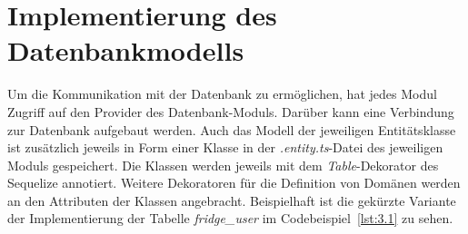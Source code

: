 \FloatBarrier
\section{Implementierung des Datenbankmodells}\label{sec:Implementierung des Datenbankmodells}

Um die Kommunikation mit der Datenbank zu ermöglichen, hat jedes Modul Zugriff auf den Provider des Datenbank-Moduls. Darüber kann eine Verbindung zur Datenbank aufgebaut werden. Auch das Modell der jeweiligen Entitätsklasse ist zusätzlich jeweils in Form einer Klasse in der \textit{.entity.ts}-Datei des jeweiligen Moduls gespeichert. Die Klassen werden jeweils mit dem \textit{Table}-Dekorator des  Sequelize annotiert. Weitere Dekoratoren für die Definition von Domänen werden an den Attributen der Klassen angebracht. Beispielhaft ist die gekürzte Variante der Implementierung der Tabelle \textit{fridge\_user} im Codebeispiel~\ref{lst:3.1} zu sehen.\\


